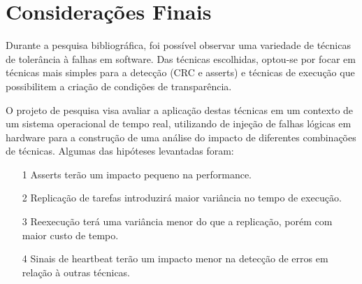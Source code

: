 \chapter{Considerações Finais}
\label{cap:consid}

Durante a pesquisa bibliográfica, foi possível observar uma variedade de técnicas de tolerância à falhas em software. Das técnicas escolhidas, optou-se por focar em técnicas mais simples para a detecção (CRC e asserts) e técnicas de execução que possibilitem a criação de condições de transparência.

O projeto de pesquisa visa avaliar a aplicação destas técnicas em um contexto de um sistema operacional de tempo real, utilizando de injeção de falhas lógicas em hardware para a construção de uma análise do impacto de diferentes combinações de técnicas. Algumas das hipóteses levantadas foram:

\begin{itemize}
	\item[1] Asserts terão um impacto pequeno na performance.
	\item[2] Replicação de tarefas introduzirá maior variância no tempo de execução.
	\item[3] Reexecução terá uma variância menor do que a replicação, porém com maior custo de tempo.
	\item[4] Sinais de heartbeat terão um impacto menor na detecção de erros em relação à outras técnicas.
\end{itemize}

